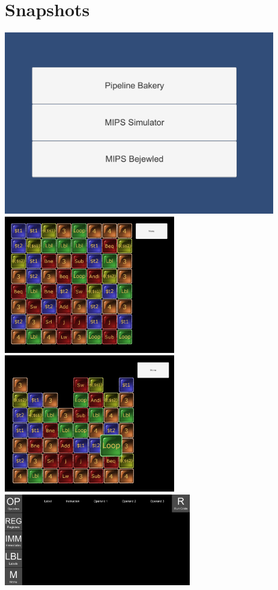\documentclass[12pt]{article}
\begin{document}
	\section{Snapshots}
	\includegraphics[height=8cm]{MainMenu.png}\\
	\includegraphics[height=6cm]{MIPSBejeweled.png}
	\includegraphics[height=6cm]{BejeweledHowTo.png}\\
	\includegraphics[height=4cm]{MIPSSimulatorStart.png}
\end{document}
